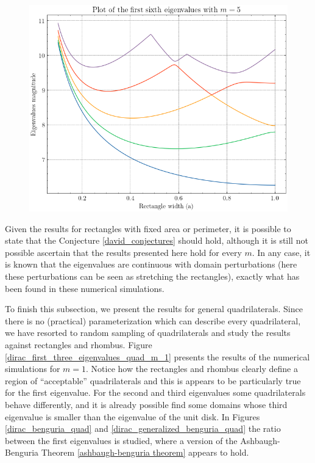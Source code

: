 \begin{figure}[!htb]
\begin{minipage}{.5\textwidth}
      \includegraphics[width=1\linewidth]{Images/Dirac/quad/eigenvalues_rectangle_perimeter_width_m_5.png}
      \captionsetup{width=0.9\linewidth} %
      \label{eigenvalues_rectangle_perimeter_width_m_5}
    \end{minipage}
\end{figure}

Given the results for rectangles with fixed area or perimeter, it is possible to state that the Conjecture \ref{david_conjectures} should hold, although it is still not possible ascertain that the results presented here hold for every \(m\). In any case, it is known that the eigenvalues are continuous with domain perturbations (here these perturbations can be seen as stretching the rectangles), exactly what has been found in these numerical simulations.

To finish this subsection, we present the results for general quadrilaterals. Since there is no (practical) parameterization which can describe every quadrilateral, we have resorted to random sampling of quadrilaterals and study the results against rectangles and rhombus. Figure \ref{dirac_first_three_eigenvalues_quad_m_1} presents the results of the numerical simulations for \(m=1\). Notice how the rectangles and rhombus clearly define a region of ``acceptable'' quadrilaterals and this is appears to be particularly true for the first eigenvalue. For the second and third eigenvalues some quadrilaterals behave differently, and it is already possible find some domains whose third eigenvalue is smaller than the eigenvalue of the unit disk. In Figures \ref{dirac_benguria_quad} and \ref{dirac_generalized_benguria_quad} the ratio between the first eigenvalues is studied, where a version of the Ashbaugh-Benguria Theorem \ref{ashbaugh-benguria theorem} appears to hold.

